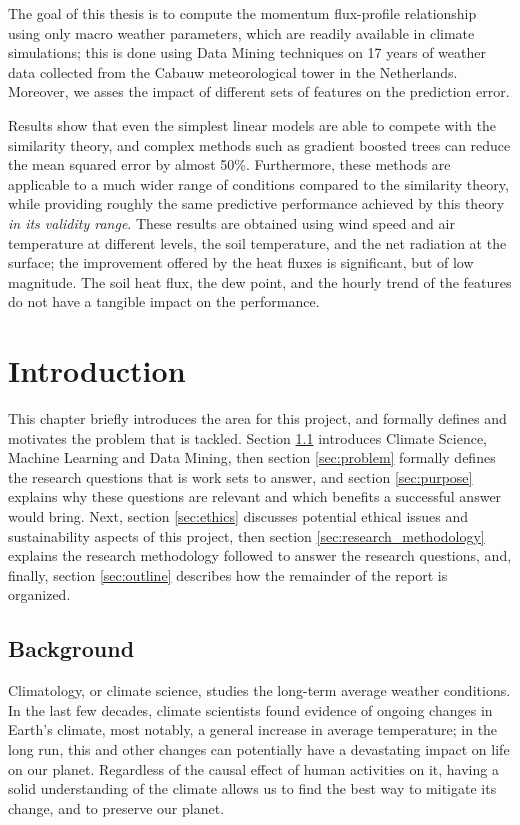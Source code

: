 \documentclass[a4paper]{book}
\begin{document}
The goal of this thesis is to compute the momentum flux-profile relationship using only macro weather parameters, which are readily available in climate simulations; this is done using Data Mining techniques on 17 years of weather data collected from the Cabauw meteorological tower in the Netherlands. Moreover, we asses the impact of different sets of features on the prediction error.

Results show that even the simplest linear models are able to compete with the similarity theory, and complex methods such as gradient boosted trees can reduce the mean squared error by almost 50\%. Furthermore, these methods are applicable to a much wider range of conditions compared to the similarity theory, while providing roughly the same predictive performance achieved by this theory \emph{in its validity range}. These results are obtained using wind speed and air temperature at different levels, the soil temperature, and the net radiation at the surface; the improvement offered by the heat fluxes is significant, but of low magnitude. The soil heat flux, the dew point, and the hourly trend of the features do not have a tangible impact on the performance.

\tableofcontents

\listoffigures

\listoftables

\chapter{Introduction}
This chapter briefly introduces the area for this project, and formally defines and motivates the problem that is tackled. Section \ref{sec:intro_bg} introduces Climate Science, Machine Learning and Data Mining, then section \ref{sec:problem} formally defines the research questions that is work sets to answer, and section \ref{sec:purpose} explains why these questions are relevant and which benefits a successful answer would bring. Next, section \ref{sec:ethics} discusses potential ethical issues and sustainability aspects of this project, then section \ref{sec:research_methodology} explains the research methodology followed to answer the research questions, and, finally, section \ref{sec:outline} describes how the remainder of the report is organized.

\section{Background}
\label{sec:intro_bg}
Climatology, or climate science, studies the long-term average weather conditions. In the last few decades, climate scientists found evidence of ongoing changes in Earth's climate, most notably, a general increase in average temperature; in the long run, this and other changes can potentially have a devastating impact on life on our planet. Regardless of the causal effect of human activities on it, having a solid understanding of the climate allows us to find the best way to mitigate its change, and to preserve our planet.
\end{document}
